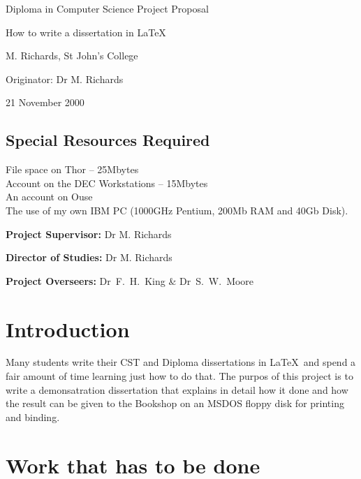 

\vfil

\centerline{\Large Diploma in Computer Science Project Proposal}
\vspace{0.4in}
\centerline{\Large How to write a dissertation in \LaTeX\ }
\vspace{0.4in}
\centerline{\large M. Richards, St John's College}
\vspace{0.3in}
\centerline{\large Originator: Dr M. Richards}
\vspace{0.3in}
\centerline{\large 21 November 2000}

\vfil

\subsection*{Special Resources Required}
File space on Thor -- 25Mbytes\\
Account on the DEC Workstations -- 15Mbytes\\
An account on Ouse\\
The use of my own IBM PC (1000GHz Pentium, 200Mb RAM and 40Gb Disk).
\vspace{0.2in}

\noindent
{\bf Project Supervisor:} Dr M. Richards
\vspace{0.2in}

\noindent
{\bf Director of Studies:} Dr M. Richards
\vspace{0.2in}
\noindent
 
\noindent
{\bf Project Overseers:} Dr~F.~H.~King  \& Dr~S.~W.~Moore

\vfil
\pagebreak


\section*{Introduction}

Many students write their CST and Diploma dissertations in \LaTeX\ and
spend a fair amount of time learning just how to do that. The purpos of 
this project is to write a demonsatration dissertation that explains in
detail how it done and how the result can be given to the Bookshop
on an MSDOS floppy disk for printing and binding.

\section*{Work that has to be done}


